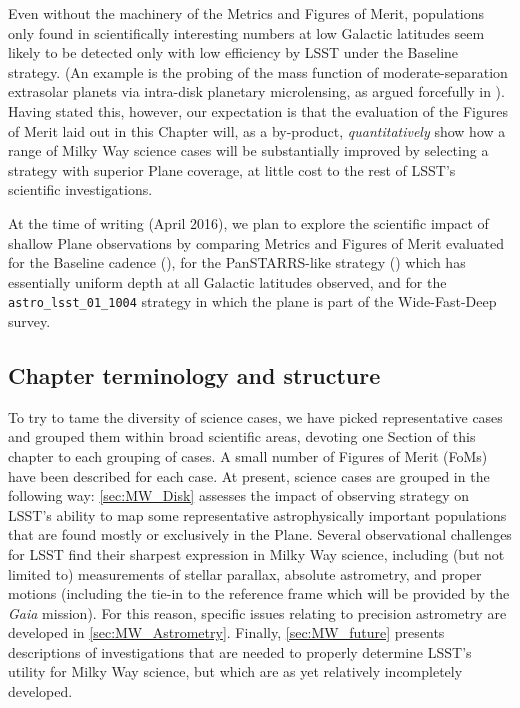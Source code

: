 Even without the machinery of the Metrics and Figures of Merit,
populations only found in scientifically interesting numbers at low
Galactic latitudes seem likely to be detected only with low efficiency
by LSST under the Baseline strategy. (An example is the probing of the
mass function of moderate-separation extrasolar planets via intra-disk
planetary microlensing, as argued forcefully in \citet{gould13}). Having
stated this, however, our expectation is that the evaluation of the
Figures of Merit laid out in this Chapter will, as a by-product, {\it
quantitatively} show how a range of Milky Way science cases will be
substantially improved by selecting a strategy with superior Plane
coverage, at little cost to the rest of LSST's scientific
investigations.

At the time of writing (April 2016), we plan to explore the scientific
impact of shallow Plane observations by comparing Metrics and Figures of
Merit evaluated for the Baseline cadence (),
for the PanSTARRS-like strategy () which has
essentially uniform depth at all Galactic latitudes observed, and for
the {\tt astro\_lsst\_01\_1004} strategy in which the plane is part of
the Wide-Fast-Deep survey.


\subsection{Chapter terminology and structure}

To try to tame the diversity of science cases, we have picked
representative cases and grouped them within broad scientific areas,
devoting one Section of this chapter to each grouping of cases. A small
number of Figures of Merit (FoMs) have been described for each case. 
At present, science cases are grouped in the following way:
\autoref{sec:MW_Disk} assesses the impact of observing strategy on
LSST's ability to map some representative astrophysically important
populations that are found mostly or exclusively in the Plane.
Several observational challenges for LSST find their
sharpest expression in Milky Way science, including (but not limited to)
measurements of stellar parallax, absolute astrometry, and proper
motions (including the tie-in to the reference frame which will be
provided by the \textit{Gaia} mission). For this reason, specific issues
relating to precision astrometry are developed in
\autoref{sec:MW_Astrometry}.
Finally, \autoref{sec:MW_future}
presents descriptions of investigations that are needed to properly
determine LSST's utility for Milky Way science, but which
are as yet relatively incompletely developed.

